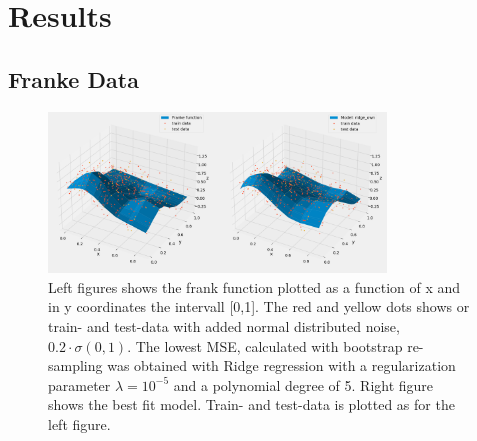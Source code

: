 \section{Results}

\subsection{Franke Data}
\begin{figure}[H]
    \centering \includegraphics[width=0.8\textwidth]{Figures/franke_data_and_model_ridge_best.png}
    \caption{Left figures shows the frank function plotted as a function of x
    and in y coordinates the intervall [0,1]. The red and yellow dots shows or
train- and test-data with added normal distributed noise, $0.2 \cdot
\sigma(0,1)$. The lowest MSE, calculated with bootstrap re-sampling was obtained
with Ridge regression with a regularization parameter $\lambda = 10^{-5}$ and a
polynomial degree of 5. Right figure shows the best fit model. Train- and
test-data is plotted as for the left figure.} 
\end{figure}

